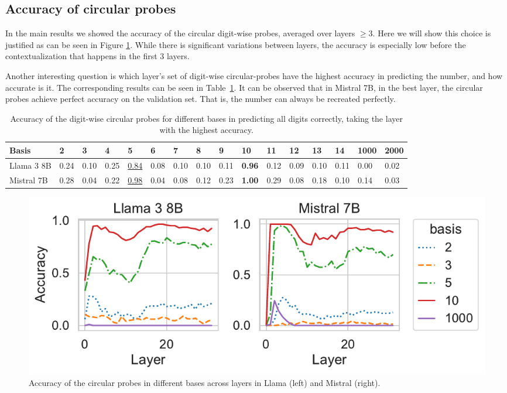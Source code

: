 \documentclass[11pt]{article}
\begin{document}
\subsection{Accuracy of circular probes}
\label{apx:probes}
In the main results we showed the accuracy of the circular digit-wise probes, averaged over layers $\geq 3$. Here we will show this choice is justified as can be seen in Figure \ref{fig:accuracy_per_layer}. While there is significant variations between layers, the accuracy is especially low before the contextualization that happens in the first 3 layers.

Another interesting question is which layer's set of digit-wise circular-probes have the highest accuracy in predicting the number, and how accurate is it. The corresponding results can be seen in Table~\ref{table:max_accuracy}. It can be observed that in Mistral 7B, in the best layer, the circular probes achieve perfect accuracy on the validation set. That is, the number can always be recreated perfectly.

\begin{table}[t]
\setlength\tabcolsep{4pt}
\footnotesize
\centering
\begin{tabular}{l*{15}{l}}
\toprule
Basis &  2    &  3    &  4    &  5    &  6    &  7    &  8    &  9    &  10   &  11   &  12   &  13   &  14   & 1000 & 2000 \\
\midrule
Llama 3 8B &  0.24 &  0.10 &  0.25 &  \underline{0.84} &  0.08 &  0.10 &  0.10 &  0.11 &  \textbf{0.96} &  0.12 &  0.09 &  0.10 &  0.11 & 0.00 & 0.02 \\
Mistral 7B &  0.28 &  0.04 &  0.22 &  \underline{0.98} &  0.04 & 0.08 &  0.12 &  0.23 &  \textbf{1.00} &  0.29 &  0.08 &  0.18 &  0.10 & 0.14 & 0.03 \\
\bottomrule
\end{tabular}
\caption{
Accuracy of the digit-wise circular probes for different bases in predicting all digits correctly, taking the layer with the highest accuracy.}
\label{table:max_accuracy}
\end{table}


\begin{figure}[ht]
\centering
    \includegraphics[scale=0.45]{acc-per-layer-horizontal.pdf}
    \caption{Accuracy of the circular probes in different bases across layers in Llama (left) and Mistral (right).}
    \label{fig:accuracy_per_layer}
\end{figure}
\end{document}
